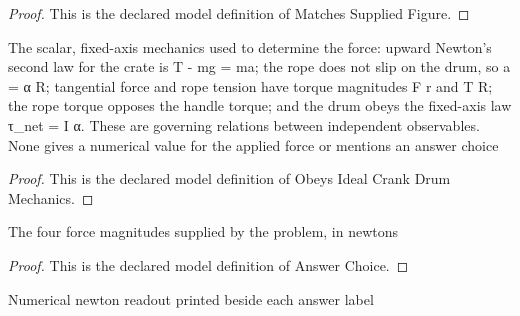 \begin{proof}
  This is the declared model definition of Matches Supplied Figure.
\end{proof}
\begin{definition}
  \label{def:physics:phyx-mini-0784:phyxminiproblems-problemphyxmini0784-obeysidealcrankdrummechanics}
  The scalar, fixed-axis mechanics used to determine the force: upward Newton's second law for the crate is T - mg = ma; the rope does not slip on the drum, so a = α R; tangential force and rope tension have torque magnitudes F r and T R; the rope torque opposes the handle torque; and the drum obeys the fixed-axis law τ\_net = I α. These are governing relations between independent observables. None gives a numerical value for the applied force or mentions an answer choice
\end{definition}
\begin{proof}
  This is the declared model definition of Obeys Ideal Crank Drum Mechanics.
\end{proof}
\begin{definition}
  \label{def:physics:phyx-mini-0784:phyxminiproblems-problemphyxmini0784-answerchoice}
  The four force magnitudes supplied by the problem, in newtons
\end{definition}
\begin{proof}
  This is the declared model definition of Answer Choice.
\end{proof}
\begin{definition}
  \label{def:physics:phyx-mini-0784:phyxminiproblems-problemphyxmini0784-answermagnitudeinnewtons}
  Numerical newton readout printed beside each answer label
\end{definition}
